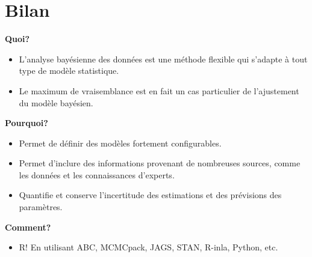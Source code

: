\newpage
\section{Bilan}
\begin{description}
	\item \textbf{Quoi?}
	   \begin{itemize}
		   \item L'analyse bay\'esienne des donn\'ees est une m\'ethode flexible qui s'adapte \`a tout type de mod\`ele statistique. 
			 \item Le maximum de vraisemblance est en fait un cas particulier de l'ajustement du mod\`ele bay\'esien.
	   \end{itemize}
	\item \textbf{Pourquoi?}
			\begin{itemize}
				\item Permet de d\'efinir des mod\`eles fortement configurables.
				\item Permet d'inclure des informations provenant de nombreuses sources, comme les donn\'ees et les connaissances d'experts.
				\item Quantifie et conserve l'incertitude des estimations et des pr\'evisions des param\`etres.
			\end{itemize}
	\item \textbf{Comment?}
	\begin{itemize}
	       \item R! En utilisant ABC, MCMCpack, JAGS, STAN, R-inla, Python, etc.
	       \end{itemize}
\end{description}

\appendix


